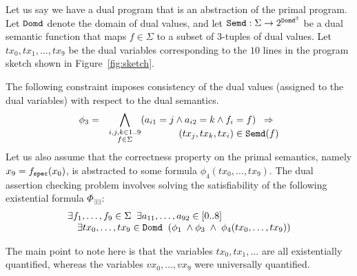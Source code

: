 \documentclass[preprint]{sig-alternate-05-2015}
\def\semd{{\tt{Semd}}}
\newcommand\ignore[1]{{}}
\def\domd{{\tt{Domd}}}
\def\spec{{\tt{spec}}}
\def\Sig{{\Sigma}}
\def\ite{{\texttt{if-then-else}}}
\begin{document}
Let us say we have a dual program that is an abstraction of the
primal program.
Let $\domd$ denote the domain of dual values, and let
$\semd: \Sig \rightarrow 2^{\domd^3}$ be a
dual semantic function that maps $f\in\Sig$ to a subset of 3-tuples
of dual values.
Let
$tx_0, tx_1,\ldots,tx_9$ be the dual variables corresponding to the
$10$ lines in the program sketch shown in Figure~\ref{fig:sketch}.

The following constraint imposes consistency of the dual values
(assigned to the dual variables) with respect to the dual semantics.
\begin{eqnarray*}
  \phi_3 & = & \bigwedge_{\substack{i,j,k\in 1..9\\ f\in\Sig}} (a_{i1} = j \wedge a_{i2}=k \wedge f_i=f)\;\;\Rightarrow\;\;
      \\*[-2.0em] & & \qquad\qquad\qquad 
    (tx_j,tx_k,tx_i)\in \semd(f)
\end{eqnarray*}

Let us also assume that the correctness property on the primal semantics, namely
$x_9 = f_\spec(x_0)$, is abstracted to
some formula $\phi_4(tx_0,\ldots,tx_9)$.
The dual assertion checking problem involves solving the satisfiability of
the following existential formula $\Phi_{\exists\exists}$:
\[
  \begin{array}{l}
  \exists{f_1,\ldots,f_9}\in\Sig\;\;
  \exists{a_{11},\ldots,a_{92}}\in [0..8]\;\;
  \\ \quad
  \exists{tx_0,\ldots,tx_9}\in\domd\;\;
  (\phi_1 \; \wedge
  \phi_3 \;\wedge\; \phi_4(tx_0,\ldots,tx_9))
\end{array}
\]

The main point to note here is that the variables
$tx_0,tx_1,\ldots$ are all existentially quantified,
whereas the variables $vx_0, \ldots, vx_9$ were universally quantified.

\ignore{

If we also allow $\ite$ statements in programs, then the
translation into $\exists\forall$ is slightly more
complicated.   The key point to note here is that
loop-free programs with $\ite$ can be written
as straight-line programs with $\Phi$ (Phi) functions.
So, synthesis of loop-free programs can be performed
by synthesizing straight-line programs, but allowing the
use of $\Phi$ functions in the straight-line code.
It is easy to see that the dual semantics of $\ite$
can be adapted to define semantics of an assignment
statement that contains a $\Phi$ function on the right-hand
side.

\endignore}
\end{document}
